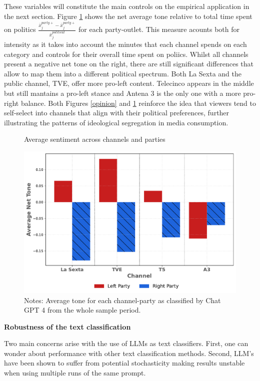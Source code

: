 \documentclass[12pt]{article}
\begin{document}
	These variables will constitute the main controls on the empirical application in the next section.  Figure \ref{fig:chat} shows the net average tone relative to total time spent on politics $ \frac{\bar{x}_j^{party+}  - \bar{x}_j^{party+} }{\bar{x}_j^{political}}$ for each party-outlet. This measure acounts both for intensity as it takes into account the minutes that each channel spends on each category and controls for their overall time spent on poliics. Whilst all channels present a negative net tone on the right, there are still significant differences that allow to map them into a different political spectrum. Both La Sexta and the public channel, TVE, offer more pro-left content. Telecinco appears in the middle but still mantains a pro-left stance and Antena 3 is the only one with a more pro-right balance. 	 Both Figures \ref{opinion} and \ref{fig:chat} reinforce the idea that viewers tend to self-select into channels that align with their political preferences, further illustrating the patterns of ideological segregation in media consumption.
	
	
	
	
	
	\begin{figure}[h!]
		\caption{Average sentiment across channels and parties}
		\centering
		\includegraphics[width=120mm]{figures/chatgpt}
		\caption*{\small Notes: Average tone for each channel-party as classified by Chat GPT 4 from the whole sample period. }
		\label{fig:chat}
	\end{figure}
	
	
	
	\textbf{Robustness of  the text classification}
	
	Two main concerns arise with the use of LLMs as text classifiers. First, one can wonder about performance with other text classification methods. Second, LLM's have been shown to suffer from potential stochasticity making results unstable when using multiple runs of the same prompt. 
	
\end{document}
